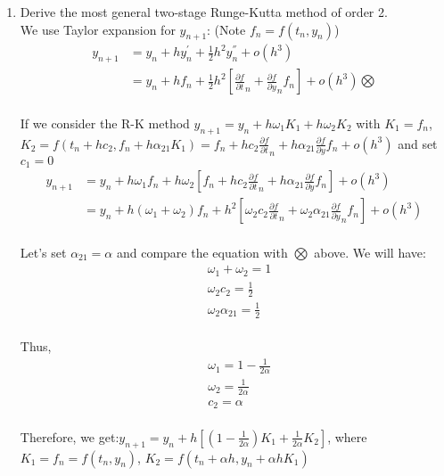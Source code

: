 \documentclass[12pt]{amsart}
\numberwithin{equation}{section}
\numberwithin{table}{section}
\numberwithin{figure}{section}
\numberwithin{algorithm}{section}
\begin{document}
\begin{enumerate}
\item Derive the most general two-stage Runge-Kutta method of order 2.\\
We use Taylor expansion for $y_{n+1}$: (Note $f_n=f(t_n,y_n)$)
\begin{align*}
y_{n+1}&=y_n+hy^{'}_n+\frac{1}{2}h^2y^{''}_n+o(h^3)\\
&=y_n+hf_n+\frac{1}{2}h^2[\frac{\partial f}{\partial t}_n+\frac{\partial f}{\partial y}_nf_n]+o(h^3)\bigotimes
\end{align*}\\
If we consider the R-K method $y_{n+1}=y_n+h\omega_1K_1+h\omega_2K_2$ with $K_1=f_n$, $K_2=f(t_n+hc_2,f_n+h\alpha_{21}K_1)=f_n+hc_2\frac{\partial f}{\partial t}_n+h\alpha_{21}\frac{\partial f}{\partial y}f_n+o(h^3)$ and set $c_1=0$\\
\begin{align*}
y_{n+1}&=y_n+h\omega_1 f_n + h\omega_2 [f_n+hc_2\frac{\partial f}{\partial t}_n+h\alpha_{21}\frac{\partial f}{\partial y}f_n]+o(h^3)\\
&=y_n+h(\omega_1+\omega_2)f_n+h^2[\omega_2 c_2\frac{\partial f}{\partial t}_n+\omega_2 \alpha_{21}\frac{\partial f}{\partial y}_nf_n]+o(h^3)
\end{align*}\\
Let's set $\alpha_{21}=\alpha$ and compare the equation with $\bigotimes$ above. We will have:\\
\begin{align*}
&\omega_1+\omega_2=1\\
&\omega_2 c_2=\frac{1}{2}\\
&\omega_2 \alpha_{21}=\frac{1}{2}
\end{align*}\\
Thus,\\
\begin{align*}
&\omega_1=1-\frac{1}{2\alpha}\\
&\omega_2=\frac{1}{2\alpha}\\
&c_2=\alpha
\end{align*}\\
Therefore, we get:$y_{n+1}=y_n+h[(1-\frac{1}{2\alpha})K_1+\frac{1}{2\alpha}K_2]$, where $K_1=f_n=f(t_n,y_n)$, $K_2=f(t_n+\alpha h,y_n+\alpha h K_1)$\\
\


\end{enumerate}
\end{document}

